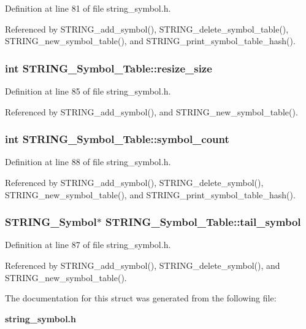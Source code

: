 Definition at line 81 of file string\_\-symbol.h.

Referenced by STRING\_\-add\_\-symbol(), STRING\_\-delete\_\-symbol\_\-table(), STRING\_\-new\_\-symbol\_\-table(), and STRING\_\-print\_\-symbol\_\-table\_\-hash().
\subsubsection{\setlength{\rightskip}{0pt plus 5cm}int \bf{STRING\_\-Symbol\_\-Table::resize\_\-size}}\label{structSTRING__Symbol__Table_df4606be45e9539e828643f02ec5b462}




Definition at line 85 of file string\_\-symbol.h.

Referenced by STRING\_\-add\_\-symbol(), and STRING\_\-new\_\-symbol\_\-table().
\subsubsection{\setlength{\rightskip}{0pt plus 5cm}int \bf{STRING\_\-Symbol\_\-Table::symbol\_\-count}}\label{structSTRING__Symbol__Table_9d49a5fd422b63651917de8c414c3483}




Definition at line 88 of file string\_\-symbol.h.

Referenced by STRING\_\-add\_\-symbol(), STRING\_\-delete\_\-symbol(), STRING\_\-new\_\-symbol\_\-table(), and STRING\_\-print\_\-symbol\_\-table\_\-hash().
\subsubsection{\setlength{\rightskip}{0pt plus 5cm}\bf{STRING\_\-Symbol}$\ast$ \bf{STRING\_\-Symbol\_\-Table::tail\_\-symbol}}\label{structSTRING__Symbol__Table_7e0cad9f6c4c139672eb3fdc17238fc9}




Definition at line 87 of file string\_\-symbol.h.

Referenced by STRING\_\-add\_\-symbol(), STRING\_\-delete\_\-symbol(), and STRING\_\-new\_\-symbol\_\-table().

The documentation for this struct was generated from the following file:\begin{CompactItemize}
\item 
\bf{string\_\-symbol.h}\end{CompactItemize}
